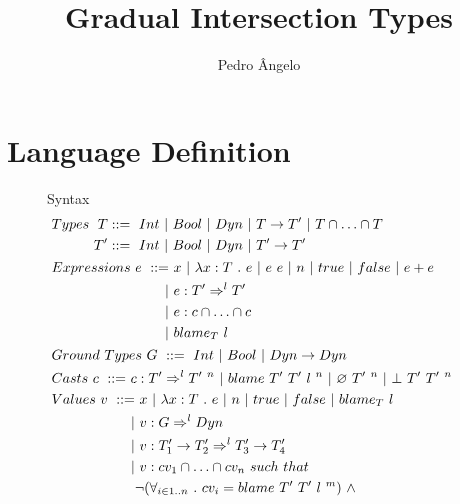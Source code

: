 \documentclass[a4paper]{article}
\begin{document}
\title{Gradual Intersection Types}

\author{Pedro Ângelo}

\maketitle
{}

\section{Language Definition}
\begin{figure}[H]
Syntax
\begin{align*}
&Types\ \begin{aligned}[t] T &::=\ \Int\ |\ \Bool\ |\ \Dyn\ |\ T \rightarrow T'\ |\ T \cap \ldots \cap T\\
                          T' &::=\ \Int\ |\ \Bool\ |\ \Dyn\ |\ T' \rightarrow T' \end{aligned}\\
&Expressions\ \begin{aligned}[t] e\ ::=&\ x\ |\ \lambda x : T\ .\ e\ |\ e\ e\ |\ n\ |\ \true\ |\ \false\ |\ e + e\\
                                      |&\ e : T' \Rightarrow^l T'\\
                                      |&\ e : c \cap \ldots \cap c\\
                                      |&\ \blame{T}{l} \end{aligned}\\
&Ground\ Types\ G\ ::=\ \Int\ |\ \Bool\ |\ \Dyn \rightarrow \Dyn\\
&Casts\ \begin{aligned}[t] c\ ::=&\ c : T' \Rightarrow^l T'\ ^n\ |\ \blamecast{T'}{T'}{l}{n}\ |\ \emptycast{T'}{n}\ |\ \stuckcast{T'}{T'}{n}\end{aligned}\\
&Values\ \begin{aligned}[t] v\ ::=&\ x\ |\ \lambda x : T\ .\ e\ |\ n\ |\ \true\ |\ \false\ |\ \blame{T}{l}\\
                                 |&\ v : G \Rightarrow^l \Dyn\\
                                 |&\ v : T'_1 \rightarrow T'_2 \Rightarrow^l T'_3 \rightarrow T'_4\\
                                 |&\ v : cv_1 \cap \ldots \cap cv_n\ such\ that\\
                                 &\neg(\forall_{i\in 1..n}\ .\ cv_i = \blamecast{T'}{T'}{l}{m})\ \land\\

\end{aligned}
\end{align*}
\end{figure}
\end{document}
